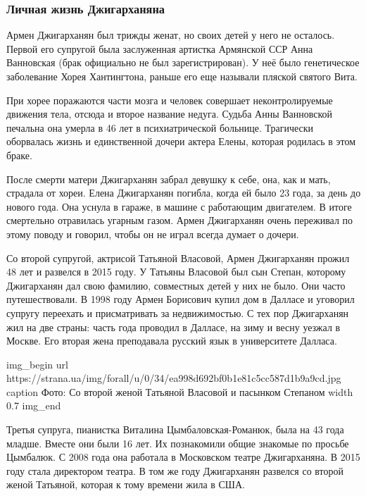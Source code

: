  
 
 

\subsubsection{Личная жизнь Джигарханяна}

Армен Джигарханян был трижды женат, но своих детей у него не осталось.
Первой его супругой была заслуженная артистка Армянской ССР Анна
Ванновская (брак официально не был зарегистрирован). У неё было
генетическое заболевание \dshM Хорея Хантингтона, раньше его еще называли
пляской святого Вита.

При хорее поражаются части мозга и человек совершает неконтролируемые
движения тела, отсюда и второе название недуга. Судьба Анны Ванновской
печальна \dshM она умерла в 46 лет в психиатрической больнице. Трагически
оборвалась жизнь и единственной дочери актера Елены, которая родилась в
этом браке.

После смерти матери Джигарханян забрал девушку к себе, она, как и мать,
страдала от хореи. Елена Джигарханян погибла, когда ей было 23 года, за
день до нового года. Она уснула в гараже, в машине с работающим
двигателем. В итоге смертельно отравилась угарным газом. Армен Джигарханян
очень переживал по этому поводу и говорил, чтобы он не играл \dshM всегда
думает о дочери.

Со второй супругой, актрисой Татьяной Власовой, Армен Джигарханян прожил
48 лет и развелся в 2015 году. У Татьяны Власовой был сын Степан, которому
Джигарханян дал свою фамилию, совместных детей у них не было. Они часто
путешествовали. В 1998 году Армен Борисович купил дом в Далласе и уговорил
супругу переехать и присматривать за недвижимостью. С тех пор Джигарханян
жил на две страны: часть года проводил в Далласе, на зиму и весну \dshM уезжал
в Москве. Его вторая жена преподавала русский язык в университете Далласа.

\ifcmt
img_begin 
	url https://strana.ua/img/forall/u/0/34/ea998d692bf0b1e81c5cc587d1b9a9cd.jpg
	caption Фото: Со второй женой Татьяной Власовой и пасынком Степаном
	width 0.7
img_end
\fi

Третья супруга, пианистка Виталина Цымбаловская-Романюк, была на 43 года
младше. Вместе они были 16 лет. Их познакомили общие знакомые по просьбе
Цымбалюк. С 2008 года она работала в Московском театре Джигарханяна. В
2015 году стала директором театра. В том же году Джигарханян развелся со
второй женой Татьяной, которая к тому времени жила в США.

